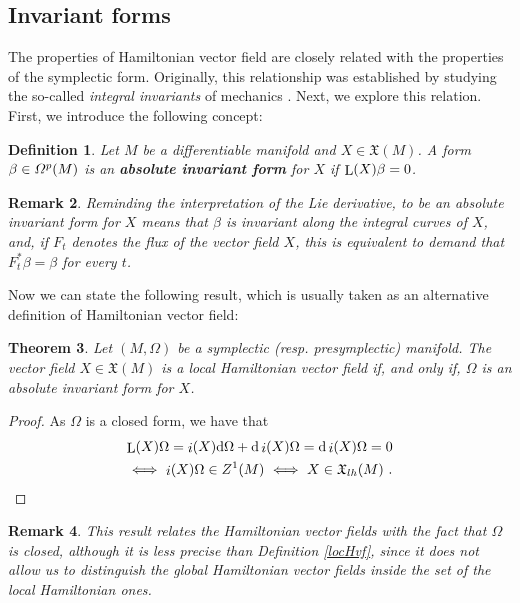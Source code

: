 \documentclass[12pt]{report}
\newtheorem{teor}{Theorem}[chapter]
\newtheorem{definition}[teor]{Definition}
\newtheorem{remark}[teor]{Remark}
\def\qed{\ifvmode\removelastskip\fi
{\unskip\nobreak\hfil\penalty50\hbox{}\nobreak\hfil
\hbox{\vrule height1.2ex width1.2ex}\parfillskip=0pt
\finalhyphendemerits=0 \par\smallskip}}
\def\vf{\mathfrak X}
\def\df{{\mit\Omega}}
\def\d{{\rm d}}
\def\Lie{\mathop{\rm L}\nolimits}
\def\inn{\mathop{i}\nolimits}
\begin{document}
\subsection{Invariant forms}


The properties of Hamiltonian vector field are closely related with the properties
of the symplectic form. 
Originally, this relationship was established by studying the so-called {\sl integral invariants} of mechanics \cite{Ca-22,DG-80,Ga-70}.
Next, we explore this relation.
First, we introduce the following concept:

\begin{definition}
Let $M$ be a differentiable manifold and $X \in \vf (M)$.
A form $\beta \in \df^p(M)$ is an \textbf{absolute invariant form}
for $X$ if $\Lie (X)\beta = 0$.
\end{definition}

\begin{remark}{\rm  
Reminding the interpretation of the Lie derivative,
to be an absolute invariant form for $X$ means that
$\beta$ is invariant along the integral curves of $X$,
and, if $F_t$ denotes the flux of the vector field $X$,
this is equivalent to demand that $F_t^*\beta = \beta$ for every $t$.
}\end{remark}

Now we can state the following result, which is usually taken 
as an alternative definition of Hamiltonian vector field:

\begin{teor}
Let $(M,\Omega )$ be a symplectic (resp. presymplectic) manifold.
The vector field $X \in \vf (M)$ is a
local Hamiltonian vector field if, and only if,
$\Omega$ is an absolute invariant form for $X$.
\label{teoin}
\end{teor}
\begin{proof}
As $\Omega$ is a closed form, we have that
\begin{multline*}
\Lie (X)\Omega = \inn (X)\d \Omega + \d\inn (X)\Omega =
\d\inn (X)\Omega = 0 \\
\ \Longleftrightarrow \  \inn (X)\Omega \in Z^1(M)
\ \Longleftrightarrow \ X \in \vf_{lh}(M) \ .
\end{multline*}
  \qed  \end{proof}

\begin{remark}{\rm 
This result relates the Hamiltonian vector fields with the fact that $\Omega$
is closed, although it is less precise than Definition \ref{locHvf},
since it does not allow us to distinguish the global Hamiltonian vector fields inside the set of the local Hamiltonian ones.
}\end{remark}
\end{document}
